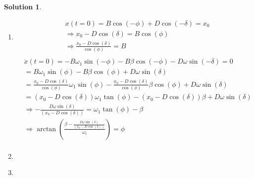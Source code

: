 \documentclass[10pt]{article}
\theoremstyle{definition}
\newtheorem{soln}{Solution}
\begin{document}
\begin{soln}~
      \begin{enumerate}[label=(\alph*)]
            \item \begin{align*}
                         & x(t=0)=B\cos\left(-\phi\right)+D\cos\left(-\delta\right)=x_0             \\
                         & \Rightarrow x_0-D\cos\left(\delta\right)=B\cos\left(\phi\right)          \\
                         & \Rightarrow \frac{x_0-D\cos\left(\delta\right)}{\cos\left(\phi\right)}=B \\
                  \end{align*}
                  \begin{align*}
                         & \dot{x}(t=0)=-B\omega_1\sin\left(-\phi\right)-B\beta\cos\left(-\phi\right)-D\omega\sin\left(-\delta\right)=0                                                                                                 \\
                         & =B\omega_1\sin\left(\phi\right)-B\beta\cos\left(\phi\right)+D\omega\sin\left(\delta\right)                                                                                                                   \\
                         & =\frac{x_0-D\cos\left(\delta\right)}{\cos\left(\phi\right)}\omega_1\sin\left(\phi\right)-\frac{x_0-D\cos\left(\delta\right)}{\cos\left(\phi\right)}\beta\cos\left(\phi\right)+D\omega\sin\left(\delta\right) \\
                         & =\left(x_0-D\cos\left(\delta\right)\right)\omega_1\tan\left(\phi\right)-\left(x_0-D\cos\left(\delta\right)\right)\beta+D\omega\sin\left(\delta\right)                                                        \\
                         & \Rightarrow -\frac{D\omega\sin\left(\delta\right)}{\left(x_0-D\cos\left(\delta\right)\right)}=\omega_1\tan\left(\phi\right)-\beta                                                                            \\
                         & \Rightarrow \arctan\left(\frac{\beta-\frac{D\omega\sin\left(\delta\right)}{\left(x_0-D\cos\left(\delta\right)\right)}}{\omega_1}\right)=\phi                                                                 \\
                  \end{align*}

            \item \inputminted[breaklines, autogobble]{python3}{./python/q1/q1b.py} %
                  \newpage
            \item \inputminted[breaklines, autogobble]{python3}{./python/q1/q1c.py}


\end{enumerate}
\end{soln}
\end{document}
